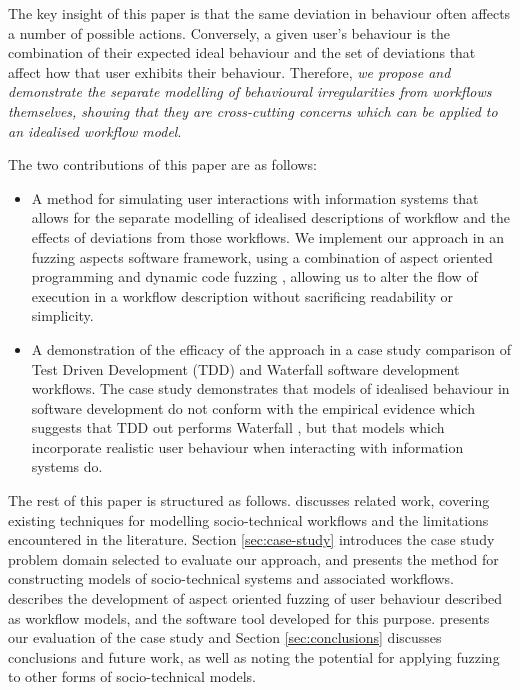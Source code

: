 \documentclass{llncs}
\begin{document}
The key insight of this paper is that the same deviation in behaviour often affects a number of possible actions.
Conversely, a given user's behaviour is the combination of their expected ideal behaviour and the set of deviations that
affect how that user exhibits their behaviour.  Therefore, \emph{we propose and demonstrate the separate
modelling of behavioural irregularities from workflows themselves, showing that they are cross-cutting concerns which can
be applied to an idealised workflow model}.

The two contributions of this paper are as follows:

\begin{itemize}

\item A method for simulating user interactions with information systems that allows for the separate modelling of
  idealised descriptions of workflow and the effects of deviations from those workflows.  We implement our approach in
  an fuzzing aspects software framework, using a combination of aspect oriented programming \cite{filman01aspect} and
  dynamic code fuzzing \citep{takanen08fuzzing}, allowing us to alter the flow of execution in a workflow description
  without sacrificing readability or simplicity.

\item A demonstration of the efficacy of the approach in a case study comparison of Test Driven Development (TDD) and
  Waterfall software development workflows.  The case study demonstrates that models of idealised behaviour in software
  development do not conform with the empirical evidence which suggests that TDD out performs Waterfall
  \citep{Bhat2006TestDrivenDevelopment,George2004TestDrivenDevelopment,Huang2009EmpiricalTestFirstProgramming}, but that
  models which incorporate realistic user behaviour when interacting with information systems do.

\end{itemize}

The rest of this paper is structured as follows.   discusses related work, covering existing
techniques for modelling socio-technical workflows and the limitations encountered in the literature.  Section
\ref{sec:case-study} introduces the case study problem domain selected to evaluate our approach, and presents the method
for constructing models of socio-technical systems and associated workflows.  describes the
development of aspect oriented fuzzing of user behaviour described as workflow models, and the software tool developed
for this purpose.   presents our evaluation of the case study and Section
\ref{sec:conclusions} discusses conclusions and future work, as well as noting the potential for applying fuzzing to
other forms of socio-technical models.
\end{document}
